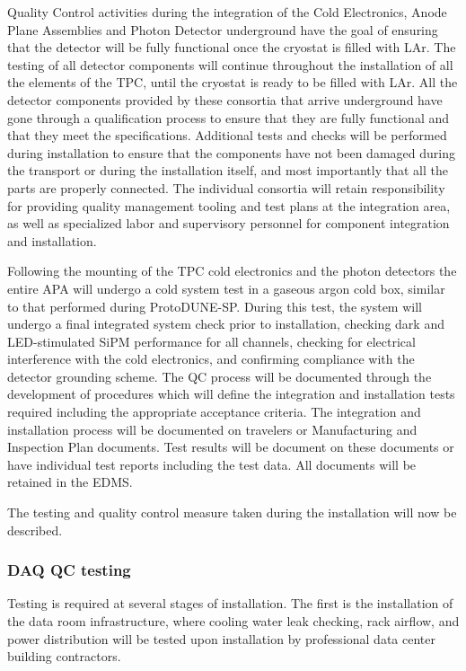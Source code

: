 Quality Control activities during the integration of the Cold Electronics, Anode Plane Assemblies and Photon Detector underground have the goal of ensuring that the detector will be fully functional once the cryostat is filled with LAr. 
The testing of all detector components will continue throughout the installation of all the elements of the TPC, until the cryostat is ready to be filled with LAr.  
All the detector components provided by these consortia that arrive underground have gone through a qualification process to ensure that they are fully functional and that they meet the  specifications. 
Additional tests and checks will be performed during installation  to ensure that the components have not been damaged during the transport or during the installation itself, and most importantly that all the parts are properly connected.  
The individual consortia will retain responsibility for providing quality management tooling and test plans at the integration area, as well as specialized labor and supervisory personnel for component integration and installation.

Following the mounting of the TPC cold electronics and the photon detectors the entire APA will undergo a cold system test in a gaseous argon cold box, similar to that performed during ProtoDUNE-SP. During this test, the system will undergo a final integrated system check prior to installation, checking dark and LED-stimulated SiPM performance for all channels, checking for electrical interference with the cold electronics, and confirming compliance with the detector grounding scheme.
The QC process will be documented through the development of procedures which will define the integration and installation tests required including the appropriate acceptance criteria. 
The integration and installation process will be documented on travelers or Manufacturing and Inspection Plan documents. 
Test results will be document on these documents or have individual test reports including the test data. 
All documents will be retained in the EDMS.

The testing and quality control measure taken during the installation will now be described.


\subsubsection{DAQ QC testing}

Testing is required at several stages of  installation.  The first is the installation of the data room infrastructure, where cooling water leak checking, rack airflow, and power distribution will be tested upon installation by professional data center building contractors.


